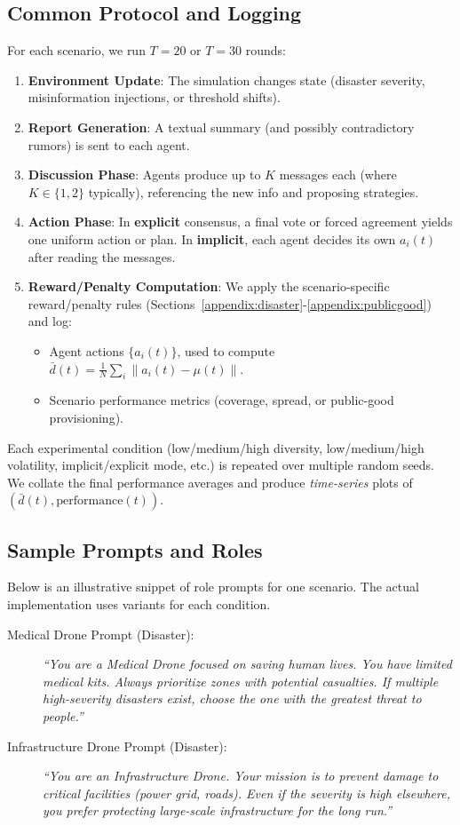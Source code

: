 \subsection{Common Protocol and Logging}
For each scenario, we run $T=20$ or $T=30$ rounds:
\begin{enumerate}
    \item \textbf{Environment Update}: The simulation changes state (disaster severity, misinformation injections, or threshold shifts).
    \item \textbf{Report Generation}: A textual summary (and possibly contradictory rumors) is sent to each agent.
    \item \textbf{Discussion Phase}: Agents produce up to $K$ messages each (where $K\in\{1,2\}$ typically), referencing the new info and proposing strategies.
    \item \textbf{Action Phase}: In \textbf{explicit} consensus, a final vote or forced agreement yields one uniform action or plan. In \textbf{implicit}, each agent decides its own $a_i(t)$ after reading the messages.
    \item \textbf{Reward/Penalty Computation}: We apply the scenario-specific reward/penalty rules (Sections~\ref{appendix:disaster}-\ref{appendix:publicgood}) and log:
    \begin{itemize}
        \item Agent actions $\{a_i(t)\}$, used to compute $\bar{d}(t) = \frac{1}{N}\sum_i\|a_i(t) - \mu(t)\|$.
        \item Scenario performance metrics (coverage, spread, or public-good provisioning).
    \end{itemize}
\end{enumerate}
Each experimental condition (low/medium/high diversity, low/medium/high volatility, implicit/explicit mode, etc.) is repeated over multiple random seeds. We collate the final performance averages and produce \emph{time-series} plots of $(\bar{d}(t), \text{performance}(t))$.

\subsection{Sample Prompts and Roles}
Below is an illustrative snippet of role prompts for one scenario. The actual implementation uses variants for each condition.

\begin{description}
\item[Medical Drone Prompt (Disaster):] 
\emph{``You are a Medical Drone focused on saving human lives. You have limited medical kits. Always prioritize zones with potential casualties. If multiple high-severity disasters exist, choose the one with the greatest threat to people.''}

\item[Infrastructure Drone Prompt (Disaster):]
\emph{``You are an Infrastructure Drone. Your mission is to prevent damage to critical facilities (power grid, roads). Even if the severity is high elsewhere, you prefer protecting large-scale infrastructure for the long run.''}
\end{description}

